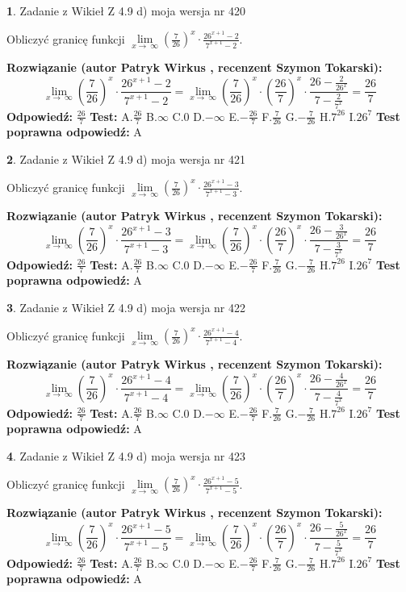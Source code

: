 \documentclass[12pt, a4paper]{article}
\theoremstyle{definition} %
\newtheorem{zad}{}
\newcommand{\zadStart}[1]{\begin{zad}#1\newline}
\newcommand{\zadStop}{\end{zad}}
\newcommand{\rozwStart}[2]{\noindent \textbf{Rozwiązanie (autor #1 , recenzent #2): }\newline}
\newcommand{\rozwStop}{\newline}
\newcommand{\odpStart}{\noindent \textbf{Odpowiedź:}\newline}
\newcommand{\odpStop}{\newline}
\newcommand{\testStart}{\noindent \textbf{Test:}\newline}
\newcommand{\testStop}{\newline}
\newcommand{\kluczStart}{\noindent \textbf{Test poprawna odpowiedź:}\newline}
\newcommand{\kluczStop}{\newline}
\begin{document}
\zadStart{Zadanie z Wikieł Z 4.9 d) moja wersja nr 420}


Obliczyć granicę funkcji  $\lim\limits_{x\to\ \infty}(\frac{7}{26})^{x}\cdot\frac{26^{x+1}-2}{7^{x+1}-2}$.
\zadStop
\rozwStart{Patryk Wirkus}{Szymon Tokarski}
$$\lim\limits_{x\to\ \infty}(\frac{7}{26})^{x}\cdot\frac{26^{x+1}-2}{7^{x+1}-2}=\lim\limits_{x\to\ \infty}(\frac{7}{26})^{x}\cdot(\frac{26}{7})^{x} \cdot \frac{26-\frac{2}{26^{x}}}{7-\frac{2}{7^{x}}} = \frac{26}{7}$$
\rozwStop
\odpStart
$\frac{26}{7}$
\odpStop
\testStart
A.$\frac{26}{7}$ B.$\infty$ C.$0$ D.$-\infty$ E.$-\frac{26}{7}$
F.$\frac{7}{26}$ G.$-\frac{7}{26}$
H.$7^{26}$
I.$26^{7}$
\testStop
\kluczStart
A
\kluczStop



\zadStart{Zadanie z Wikieł Z 4.9 d) moja wersja nr 421}


Obliczyć granicę funkcji  $\lim\limits_{x\to\ \infty}(\frac{7}{26})^{x}\cdot\frac{26^{x+1}-3}{7^{x+1}-3}$.
\zadStop
\rozwStart{Patryk Wirkus}{Szymon Tokarski}
$$\lim\limits_{x\to\ \infty}(\frac{7}{26})^{x}\cdot\frac{26^{x+1}-3}{7^{x+1}-3}=\lim\limits_{x\to\ \infty}(\frac{7}{26})^{x}\cdot(\frac{26}{7})^{x} \cdot \frac{26-\frac{3}{26^{x}}}{7-\frac{3}{7^{x}}} = \frac{26}{7}$$
\rozwStop
\odpStart
$\frac{26}{7}$
\odpStop
\testStart
A.$\frac{26}{7}$ B.$\infty$ C.$0$ D.$-\infty$ E.$-\frac{26}{7}$
F.$\frac{7}{26}$ G.$-\frac{7}{26}$
H.$7^{26}$
I.$26^{7}$
\testStop
\kluczStart
A
\kluczStop



\zadStart{Zadanie z Wikieł Z 4.9 d) moja wersja nr 422}


Obliczyć granicę funkcji  $\lim\limits_{x\to\ \infty}(\frac{7}{26})^{x}\cdot\frac{26^{x+1}-4}{7^{x+1}-4}$.
\zadStop
\rozwStart{Patryk Wirkus}{Szymon Tokarski}
$$\lim\limits_{x\to\ \infty}(\frac{7}{26})^{x}\cdot\frac{26^{x+1}-4}{7^{x+1}-4}=\lim\limits_{x\to\ \infty}(\frac{7}{26})^{x}\cdot(\frac{26}{7})^{x} \cdot \frac{26-\frac{4}{26^{x}}}{7-\frac{4}{7^{x}}} = \frac{26}{7}$$
\rozwStop
\odpStart
$\frac{26}{7}$
\odpStop
\testStart
A.$\frac{26}{7}$ B.$\infty$ C.$0$ D.$-\infty$ E.$-\frac{26}{7}$
F.$\frac{7}{26}$ G.$-\frac{7}{26}$
H.$7^{26}$
I.$26^{7}$
\testStop
\kluczStart
A
\kluczStop



\zadStart{Zadanie z Wikieł Z 4.9 d) moja wersja nr 423}


Obliczyć granicę funkcji  $\lim\limits_{x\to\ \infty}(\frac{7}{26})^{x}\cdot\frac{26^{x+1}-5}{7^{x+1}-5}$.
\zadStop
\rozwStart{Patryk Wirkus}{Szymon Tokarski}
$$\lim\limits_{x\to\ \infty}(\frac{7}{26})^{x}\cdot\frac{26^{x+1}-5}{7^{x+1}-5}=\lim\limits_{x\to\ \infty}(\frac{7}{26})^{x}\cdot(\frac{26}{7})^{x} \cdot \frac{26-\frac{5}{26^{x}}}{7-\frac{5}{7^{x}}} = \frac{26}{7}$$
\rozwStop
\odpStart
$\frac{26}{7}$
\odpStop
\testStart
A.$\frac{26}{7}$ B.$\infty$ C.$0$ D.$-\infty$ E.$-\frac{26}{7}$
F.$\frac{7}{26}$ G.$-\frac{7}{26}$
H.$7^{26}$
I.$26^{7}$
\testStop
\kluczStart
A
\kluczStop
\end{document}
